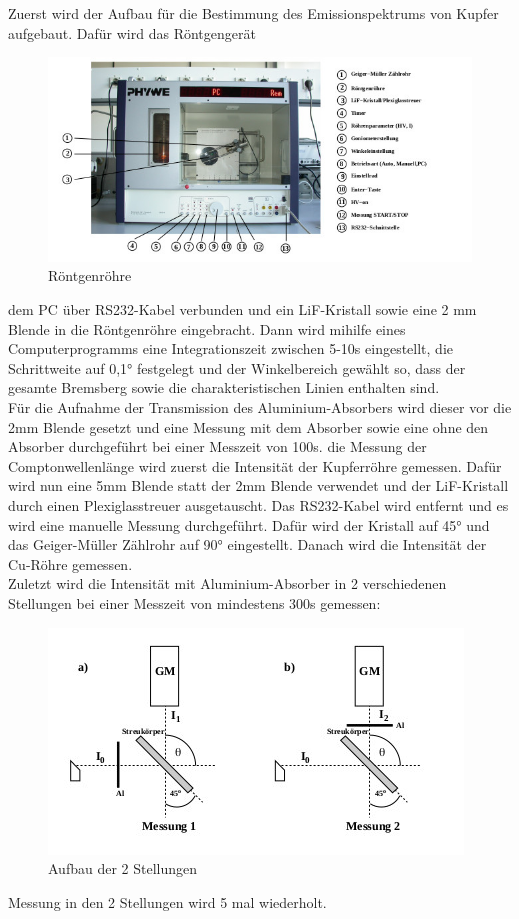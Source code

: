 Zuerst wird der Aufbau für die Bestimmung des Emissionspektrums von Kupfer aufgebaut.
Dafür wird das Röntgengerät \cite{V603}
\begin{figure}[H]
    \centering
    \includegraphics[width=\linewidth]{./images/Aufbau1.jpg}
    \caption{Röntgenröhre}
    \label{fig:1}
\end{figure}
 \justifying dem PC über RS232-Kabel verbunden und ein  LiF-Kristall sowie eine 2 mm Blende in die Röntgenröhre eingebracht. Dann wird mihilfe
eines Computerprogramms eine Integrationszeit zwischen 5-10s eingestellt, die Schrittweite auf 0,1°
festgelegt und der Winkelbereich gewählt so, dass der gesamte Bremsberg sowie die
charakteristischen Linien enthalten sind. \\
Für die Aufnahme der Transmission des Aluminium-Absorbers wird dieser vor die 2mm Blende gesetzt
und eine Messung mit dem Absorber sowie eine ohne den Absorber durchgeführt bei einer Messzeit von 100s.
\justifying die Messung der Comptonwellenlänge wird zuerst die Intensität der Kupferröhre gemessen.
Dafür wird nun eine 5mm Blende statt der 2mm Blende verwendet und der LiF-Kristall
durch einen Plexiglasstreuer ausgetauscht. Das RS232-Kabel wird entfernt und es wird
eine manuelle Messung durchgeführt. Dafür wird der Kristall auf 45° und das Geiger-Müller Zählrohr auf 90°
eingestellt. Danach wird die Intensität der Cu-Röhre gemessen.\\
Zuletzt wird die Intensität mit Aluminium-Absorber in 2 verschiedenen Stellungen bei einer Messzeit von mindestens 300s
gemessen: \cite{V603}
\begin{figure}[H]
    \centering
    \includegraphics[width=\linewidth]{./images/Aufbau2.jpg}
    \caption{Aufbau der 2 Stellungen}
    \label{fig:2}
\end{figure}
\justifying Messung in den 2 Stellungen wird 5 mal wiederholt.

